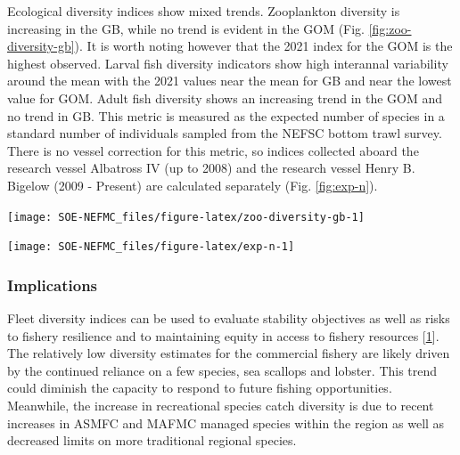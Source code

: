 \documentclass[
  10pt,
]{article}
\let\origfigure\figure
\let\endorigfigure\endfigure
\renewenvironment{figure}[1][2] {
    \expandafter\origfigure\expandafter[H]
} {
    \endorigfigure
}
\begin{document}
Ecological diversity indices show mixed trends. Zooplankton diversity is increasing in the GB, while no trend is evident in the GOM (Fig. \ref{fig:zoo-diversity-gb}). It is worth noting however that the 2021 index for the GOM is the highest observed. Larval fish diversity indicators show high interannal variability around the mean with the 2021 values near the mean for GB and near the lowest value for GOM. Adult fish diversity shows an increasing trend in the GOM and no trend in GB. This metric is measured as the expected number of species in a standard number of individuals sampled from the NEFSC bottom trawl survey. There is no vessel correction for this metric, so indices collected aboard the research vessel Albatross IV (up to 2008) and the research vessel Henry B. Bigelow (2009 - Present) are calculated separately (Fig. \ref{fig:exp-n}).

\begin{figure}

{\centering \texttt{[image: SOE-NEFMC\_files/figure-latex/zoo-diversity-gb-1]} 

}

\caption{Zooplankton diversity on Georges Bank and in the Gulf of Maine, based on Shannon diversity index. 2020 surveys were incomplete due to COVID-19.}\label{fig:zoo-diversity-gb}
\end{figure}

\begin{figure}

{\centering \texttt{[image: SOE-NEFMC\_files/figure-latex/exp-n-1]} 

}

\caption{Adult fish diversity for Georges Bank and in the Gulf of Maine, based on expected number of species. Results from survey vessels Albatross and Bigelow are reported separately due to catchability differences.}\label{fig:exp-n}
\end{figure}

\hypertarget{implications-3}{%
\subsubsection{Implications}\label{implications-3}}

Fleet diversity indices can be used to evaluate stability objectives as well as risks to fishery resilience and to maintaining equity in access to fishery resources {[}\protect\hyperlink{ref-gaichas_implementing_2018}{1}{]}. The relatively low diversity estimates for the commercial fishery are likely driven by the continued reliance on a few species, sea scallops and lobster. This trend could diminish the capacity to respond to future fishing opportunities. Meanwhile, the increase in recreational species catch diversity is due to recent increases in ASMFC and MAFMC managed species within the region as well as decreased limits on more traditional regional species.
\end{document}
